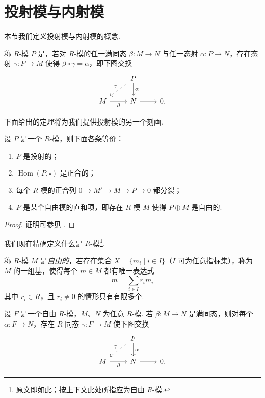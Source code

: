 \section{投射模与内射模}

本节我们定义投射模与内射模的概念.

\begin{definition}\label{c4-def-2-1}
称 $R$-模 $P$ 是，若对 $R$-模的任一满同态 $\beta:M\to N$ 与任一态射 $\alpha:P\to N$，存在态射 $\gamma:P\to M$ 使得 $\beta\circ\gamma=\alpha$，即下图交换
\[
\begin{tikzcd}
& P \arrow[d,"\alpha"] \arrow[ld,dotted,"\gamma"'] \\
M \arrow[r,"\beta"'] & N \arrow[r] & 0.
\end{tikzcd}
\]
\end{definition}

下面给出的定理将为我们提供投射模的另一个刻画.

\begin{theorem}\label{c4-thm-2-1}
设 $P$ 是一个 $R$-模，则下面各条等价：
\begin{enumerate}[label=(\arabic*),leftmargin=*]
    \item $P$ 是投射的；
    \item $\operatorname{Hom}(P, \square)$ 是正合的；
    \item 每个 $R$-模的正合列 $0\to M'\to M\to P\to 0$ 都分裂；
    \item $P$ 是某个自由模的直和项，即存在 $R$-模 $M$ 使得 $P\oplus M$ 是自由的.
\end{enumerate}
\end{theorem}

\begin{proof}
证明可参见 \cite[Proposition~3.2, Proposition~3.3 \& Theorem~3.5, Chapter~3]{rot09}.
\end{proof}

我们现在精确定义什么是 $R$-模\footnote{原文即如此；按上下文此处所指应为自由 $R$-模.}.

\begin{definition}\label{c4-def-2-2}
称 $R$-模 $M$ 是\emph{自由的}，若存在集合 $X=\{m_i\mid i\in I\}$（$I$ 可为任意指标集），称为 $M$ 的一组基，使得每个 $m\in M$ 都有唯一表达式
\[
m=\sum_{i\in I}r_im_i
\]
其中 $r_i\in R$，且 $r_i\neq 0$ 的情形只有有限多个.
\end{definition}

\begin{proposition}\label{c4-prop-2-2}
设 $F$ 是一个自由 $R$-模，$M$、$N$ 为任意 $R$-模. 若 $\beta:M\to N$ 是满同态，则对每个 $\alpha:F\to N$，存在 $R$-同态 $\gamma:F\to M$ 使下图交换
\[
\begin{tikzcd}
& F \arrow[d,"\alpha"] \arrow[ld,dotted,"\gamma"'] \\
M \arrow[r,"\beta"'] & N \arrow[r] & 0.
\end{tikzcd}
\]
\end{proposition}

